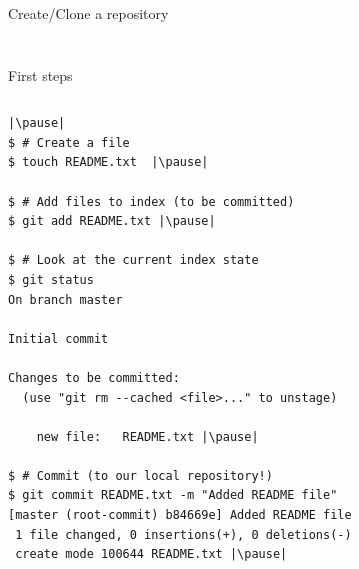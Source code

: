 \begin{frame}[fragile]{Create/Clone a repository}
\begin{columns}
\begin{column}{0.4\textwidth}
\begin{center}
{				}
			\end{center}
		\end{column}
	\end{columns}
\end{frame}


\begin{frame}[fragile]{First steps}
	\begin{columns}
		\begin{column}{0.6\textwidth}
			\begin{lstlisting}
|\pause|
$ # Create a file
$ touch README.txt  |\pause|

$ # Add files to index (to be committed)
$ git add README.txt |\pause|

$ # Look at the current index state 
$ git status
On branch master

Initial commit

Changes to be committed:
  (use "git rm --cached <file>..." to unstage)

	new file:   README.txt |\pause|

$ # Commit (to our local repository!)
$ git commit README.txt -m "Added README file"
[master (root-commit) b84669e] Added README file
 1 file changed, 0 insertions(+), 0 deletions(-)
 create mode 100644 README.txt |\pause|
 

\end{lstlisting}
\end{column}
\end{columns}
\end{frame}
